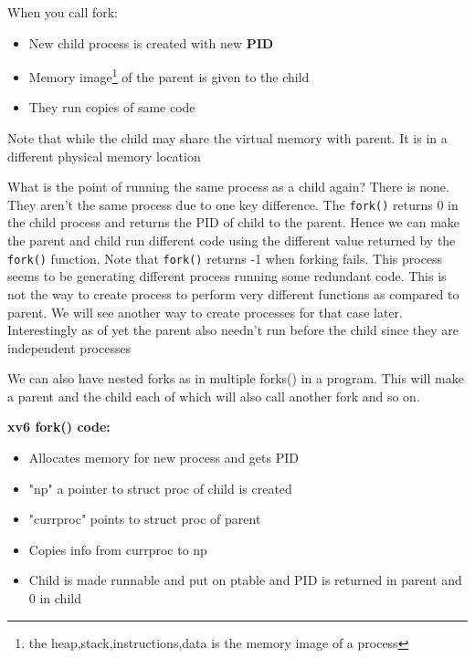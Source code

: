 \documentclass[12pt]{article}
\newcommand{\tbox}[1]{\noindent\fbox{\parbox{\textwidth}{#1}}}
\begin{document}
When you call fork:
\begin{itemize}[topsep=0pt, partopsep=0pt, itemsep=0pt, parsep=0pt]
    \item New child process is created with new \textbf{PID}
    \item Memory image\footnote{the heap,stack,instructions,data is the memory image of a process} of the parent is given to the child
    \item They run copies of same code
\end{itemize}
Note that while the child may share the virtual memory with parent. It is in a different physical memory location


What is the point of running the same process as a child again? There is none. They aren't the same process due to one key difference.
The \texttt{fork()} returns 0 in the child process and returns the PID of child to the parent. Hence we can make the parent and child run different code
using the different value returned by the \texttt{fork()} function. Note that \texttt{fork()} returns -1 when forking fails. This process seems to be generating different process running some redundant code.
This is not the way to create process to perform very different functions as compared to parent.
We will see another way to create processes for that case
later. Interestingly as of yet the parent also needn't run before the child since they are independent processes

We can also have nested forks as in multiple forks() in a program. This will make a parent and the child each of which will also call another fork and so on.


\textbf{xv6 fork() code:}
\begin{itemize}[topsep=0pt, partopsep=0pt, itemsep=0pt, parsep=0pt]
    \item Allocates memory for new process and gets PID
    \item "np" a pointer to struct proc of child is created
    \item "currproc" points to struct proc of parent
    \item Copies info from currproc to np
    \item Child is made runnable and put on ptable and PID is returned in parent and 0 in child
\end{itemize}

\newpage
\noindent\tbox{
    \begin{center}
    \textbf{\Huge Lecture 4}
    \end{center}
}
\end{document}

